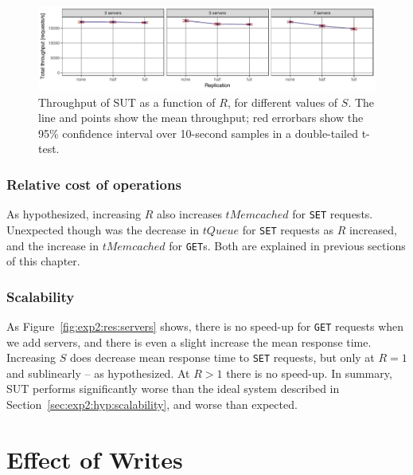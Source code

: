 \documentclass[11pt]{article}
\newcommand{\get}[0]{\texttt{GET}}
\newcommand{\set}[0]{\texttt{SET}}
\begin{document}
\begin{figure}[h]
\centering
\includegraphics[width=\textwidth]{../results/replication/graphs/tp_vs_replication_all.pdf}
\caption{Throughput of SUT as a function of $R$, for different values of $S$. The line and points show the mean throughput; red errorbars show the 95\% confidence interval over 10-second samples in a double-tailed t-test.}
\label{fig:exp2:res:throughput}
\end{figure}

\subsubsection{Relative cost of operations}
As hypothesized, increasing $R$ also increases $tMemcached$ for \set{} requests. Unexpected though was the decrease in $tQueue$ for \set{} requests as $R$ increased, and the increase in $tMemcached$ for \get{}s. Both are explained in previous sections of this chapter.

\subsubsection{Scalability}
As Figure~\ref{fig:exp2:res:servers} shows, there is no speed-up for \get{} requests when we add servers, and there is even a slight increase the mean response time. Increasing $S$ does decrease mean response time to \set{} requests, but only at $R=1$ and sublinearly -- as hypothesized. At $R>1$ there is no speed-up. In summary, SUT performs significantly worse than the ideal system described in Section~\ref{sec:exp2:hyp:scalability}, and worse than expected.

 \clearpage
\section{Effect of Writes}
\label{sec:exp3}
\end{document}
